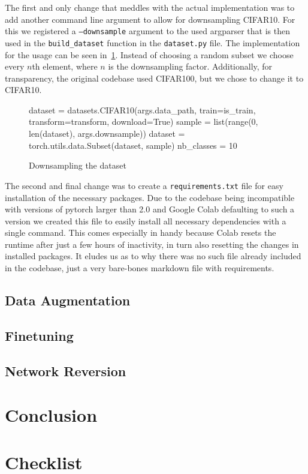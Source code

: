 \documentclass{article}
\begin{document}
    The first and only change that meddles with the actual implementation was to add another command line argument to allow for downsampling CIFAR10.
    For this we registered a \texttt{--downsample} argument to the used argparser that is then used in the \verb|build_dataset| function in the \texttt{dataset.py} file.
    The implementation for the usage can be seen in~\ref{fig:downsampling}.
    Instead of choosing a random subset we choose every $n$th element, where $n$ is the downsampling factor.
    Additionally, for transparency, the original codebase used CIFAR100, but we chose to change it to CIFAR10.
    \begin{figure}[h]
        \begin{python}
dataset = datasets.CIFAR10(args.data_path, train=is_train,
                                transform=transform, download=True)
sample = list(range(0, len(dataset), args.downsample))
dataset = torch.utils.data.Subset(dataset, sample)
nb_classes = 10
        \end{python}
        \caption{Downsampling the dataset}
        \label{fig:downsampling}


    \end{figure}

    The second and final change was to create a \texttt{requirements.txt} file for easy installation of the necessary packages.
    Due to the codebase being incompatible with versions of pytorch larger than 2.0 and Google Colab defaulting to such a version we created this file to easily install all necessary dependencies with a single command.
    This comes especially in handy because Colab resets the runtime after just a few hours of inactivity, in turn also resetting the changes in installed packages.
    It eludes us as to why there was no such file already included in the codebase, just a very bare-bones markdown file with requirements.

    \subsection{Data Augmentation}\label{subsec:data-augmentation}

    \subsection{Finetuning}\label{subsec:finetuning}

    \subsection{Network Reversion}\label{subsec:network-reversion}


    \section{Conclusion}\label{sec:conclusion}

    \printbibliography
    \section*{Checklist}
    
\end{document}
